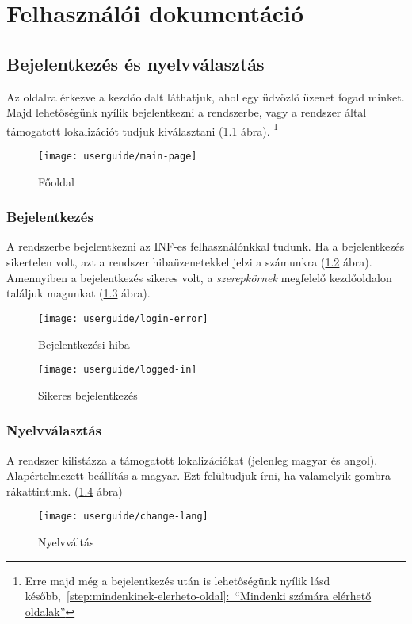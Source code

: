 \chapter{Felhasználói dokumentáció} %
\label{ch:user}

\section{Bejelentkezés és nyelvválasztás}
Az oldalra érkezve a kezdőoldalt láthatjuk, ahol egy üdvözlő üzenet fogad minket. Majd lehetőségünk nyílik bejelentkezni a rendszerbe, vagy a rendszer által támogatott lokalizációt tudjuk kiválasztani (\ref{fig:main-page} ábra). \footnote{Erre majd még a bejelentkezés után is lehetőségünk nyílik lásd később,~\hyperref[step:mindenkinek-elerheto-oldal]{\ref{step:mindenkinek-elerheto-oldal}:~``Mindenki számára elérhető oldalak''}}
\begin{figure}[H]
	\centering
	\texttt{[image: userguide/main-page]}
	\caption{Főoldal}
	\label{fig:main-page}
\end{figure}
\subsection{Bejelentkezés}
A rendszerbe bejelentkezni az INF-es felhasználónkkal tudunk. Ha a bejelentkezés sikertelen volt, azt a rendszer hibaüzenetekkel jelzi a számunkra (\ref{fig:login-error} ábra). Amennyiben a bejelentkezés sikeres volt, a \emph{szerepkörnek} megfelelő kezdőoldalon találjuk magunkat (\ref{fig:logged-in} ábra).
\begin{figure}[H]
	\centering
	\texttt{[image: userguide/login-error]}
	\caption{Bejelentkezési hiba}
	\label{fig:login-error}
\end{figure}
\begin{figure}[H]
	\centering
	\texttt{[image: userguide/logged-in]}
	\caption{Sikeres bejelentkezés}
	\label{fig:logged-in}
\end{figure}
\subsection{Nyelvválasztás}
A rendszer kilistázza a támogatott lokalizációkat (jelenleg magyar és angol). Alapértelmezett beállítás a magyar. Ezt felültudjuk írni, ha valamelyik gombra rákattintunk. (\ref{fig:change-lang} ábra)
\begin{figure}[H]
	\centering
	\texttt{[image: userguide/change-lang]}
	\caption{Nyelvváltás}
	\label{fig:change-lang}
\end{figure}
